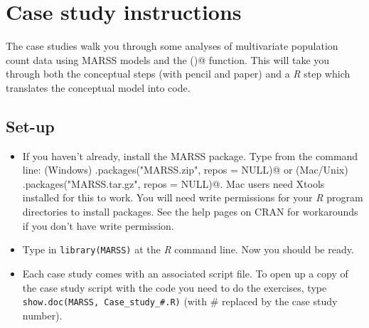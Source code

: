 \chapter{Case study instructions}
The case studies walk you through some  analyses of multivariate population count data using MARSS models and the \verb@MARSS()@ function.  This will take you through both the conceptual steps (with pencil and paper) and a \emph{R} step which translates the conceptual model into code. 

\section*{Set-up}
\begin{itemize}
\item If you haven't already, install the MARSS package.  Type from the command line: 
(Windows) \verb@install.packages("MARSS.zip", repos = NULL)@ or   
(Mac/Unix) \verb@install.packages("MARSS.tar.gz", repos = NULL)@. Mac users need Xtools installed for this to work. You will need write permissions for your \emph{R} program directories to install packages.  See the help pages on CRAN for workarounds if you don't have write permission.
\item Type in \texttt{library(MARSS)} at the \emph{R} command line.  Now you should be ready.
\item Each case study comes with an associated script file. To open up a copy of the case study script with the code you need to do the exercises, type \texttt{show.doc(MARSS, Case\_study\_\#.R)} (with \# replaced by the case study number).
\end{itemize}

